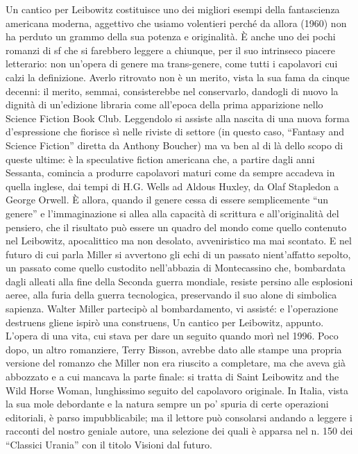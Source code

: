 Un cantico per Leibowitz costituisce uno dei migliori esempi della fantascienza americana moderna, aggettivo che usiamo volentieri perché da allora (1960) non ha perduto un grammo della sua potenza e originalità. È anche uno dei pochi romanzi di sf che si farebbero leggere a chiunque, per il suo intrinseco piacere letterario: non un'opera di genere ma trans-genere, come tutti i capolavori cui calzi la definizione. Averlo ritrovato non è un merito, vista la sua fama da cinque decenni: il merito, semmai, consisterebbe nel conservarlo, dandogli di nuovo la dignità di un'edizione libraria come all'epoca della prima apparizione nello Science Fiction Book Club. Leggendolo si assiste alla nascita di una nuova forma d'espressione che fiorisce sì nelle riviste di settore (in questo caso, “Fantasy and Science Fiction” diretta da Anthony Boucher) ma va ben al di là dello scopo di queste ultime: è la speculative fiction americana che, a partire dagli anni Sessanta, comincia a produrre capolavori maturi come da sempre accadeva in quella inglese, dai tempi di H.G. Wells ad Aldous Huxley, da Olaf Stapledon a George Orwell. È allora, quando il genere cessa di essere semplicemente “un genere” e l'immaginazione si allea alla capacità di scrittura e all'originalità del pensiero, che il risultato può essere un quadro del mondo come quello contenuto nel Leibowitz, apocalittico ma non desolato, avveniristico ma mai scontato. E nel futuro di cui parla Miller si avvertono gli echi di un passato nient'affatto sepolto, un passato come quello custodito nell'abbazia di Montecassino che, bombardata dagli alleati alla fine della Seconda guerra mondiale, resiste persino alle esplosioni aeree, alla furia della guerra tecnologica, preservando il suo alone di simbolica sapienza. Walter Miller partecipò al bombardamento, vi assisté: e l'operazione destruens gliene ispirò una construens, Un cantico per Leibowitz, appunto. L'opera di una vita, cui stava per dare un seguito quando morì nel 1996. Poco dopo, un altro romanziere, Terry Bisson, avrebbe dato alle stampe una propria versione del romanzo che Miller non era riuscito a completare, ma che aveva già abbozzato e a cui mancava la parte finale: si tratta di Saint Leibowitz and the Wild Horse Woman, lunghissimo seguito del capolavoro originale. In Italia, vista la sua mole debordante e la natura sempre un po' spuria di certe operazioni editoriali, è parso impubblicabile; ma il lettore può consolarsi andando a leggere i racconti del nostro geniale autore, una selezione dei quali è apparsa nel n. 150 dei “Classici Urania” con il titolo Visioni dal futuro.

